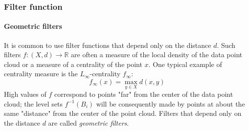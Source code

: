 \subsubsection{Filter function}
\paragraph{Geometric filters} It is common to use filter functions that depend only on the distance $d$. Such filters $f: (X,d) \rightarrow \mathbb{R}$ are often a measure of the local density of the data point cloud or a measure of a centrality of the point $x$. One typical example of centrality measure is the $L_\infty$-centrality $f_\infty$: $$ f_\infty (x) = \max _{y\in X}d(x,y) $$
High values of $f$ correspond to points "far" from the center of the data point cloud; the level sets $f^{-1}(B_i)$ will be consequently made by points at about the same "distance" from the center of the point cloud.  Filters that depend only on the distance $d$ are called \textit{geometric filters}. \newline 
